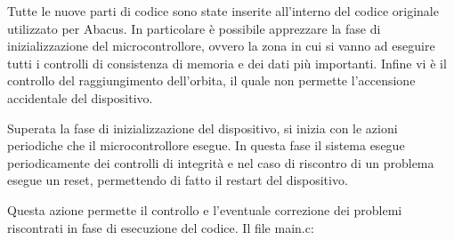 \documentclass[LaM,binding=0.6cm]{../sapthesis}
\begin{document}
Tutte le nuove parti di codice sono state inserite all'interno del codice originale utilizzato per Abacus. In particolare è possibile apprezzare la fase di inizializzazione del microcontrollore, ovvero la zona in cui si vanno ad eseguire tutti i controlli di consistenza di memoria e dei dati più importanti. Infine vi è il controllo del raggiungimento dell'orbita, il quale non permette l'accensione accidentale del dispositivo.

Superata la fase di inizializzazione del dispositivo, si inizia con le azioni periodiche che il microcontrollore esegue. In questa fase il sistema esegue periodicamente dei controlli di integrità e nel caso di riscontro di un problema esegue un reset, permettendo di fatto il restart del dispositivo. 

Questa azione permette il controllo e l'eventuale correzione dei problemi riscontrati in fase di esecuzione del codice.
\newline\newline
Il file main.c:
\end{document}
